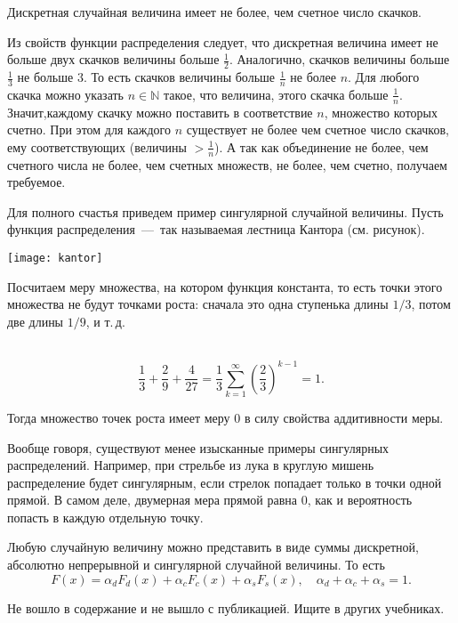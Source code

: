 \documentclass[../TV&MS.tex]{subfiles}
\begin{document}
\begin{St}
	Дискретная случайная величина имеет не более, чем счетное число скачков.
\end{St}
\begin{Proof}
Из свойств функции распределения следует, что дискретная величина имеет не больше 
двух скачков величины больше $\frac12$. Аналогично, скачков величины больше $\frac13$ 
не больше $3$. То есть скачков величины больше $\frac1n$ не более $n$. Для любого скачка 
можно указать $n \in \mathbb{N}$ такое, что величина, этого скачка больше $\frac1n$. 
Значит,каждому скачку можно поставить в соответствие $n$, множество которых счетно. 
При этом для каждого $n$ существует не более чем счетное число скачков, ему соответствующих 
(величины $>\frac1n$). А так как объединение не более, чем счетного числа не более, чем 
счетных множеств, не более, чем счетно, получаем требуемое. 
\end{Proof}

\begin{Ex}
Для полного счастья приведем пример сингулярной случайной величины. Пусть функция 
распределения~---~так называемая лестница Кантора (см. рисунок).
\parbox[b][3 cm][t]{20mm}{\texttt{[image: kantor]}}
\hfill
\parbox[b][3 cm][t]{100mm}{
	Посчитаем меру множества, на котором функция константа, то есть точки этого множества не 
	будут точками роста: сначала это одна ступенька длины $1/3$, потом две длины $1/9$, и т.\,д.
}\\
	$$ \frac13 + \frac29 + \frac4{27} = \frac13 \sum\limits_{k=1}^\infty(\frac23)^{k-1} = 1.$$

	Тогда множество точек роста имеет меру $0$ в силу свойства аддитивности меры.
\end{Ex}

Вообще говоря, существуют менее изысканные примеры сингулярных распределений. Например, при 
стрельбе из лука в круглую мишень распределение будет сингулярным, если стрелок попадает только 
в точки одной прямой. В самом деле, двумерная мера прямой равна $0$, как и вероятность 
попасть в каждую отдельную точку. 

\begin{Th} [Лебега]
	Любую случайную величину можно представить в виде суммы дискретной, абсолютно непрерывной и 
	сингулярной случайной величины. То есть 
	$$ F(x) = \alpha_dF_d(x) + \alpha_cF_c(x) + \alpha_sF_s(x), 
	\quad \alpha_d + \alpha_c + \alpha_s = 1.$$
\end{Th}
\begin{Proof}
Не вошло в содержание и не вышло с публикацией. Ищите в других учебниках.
\end{Proof}

\newpage
\end{document}
